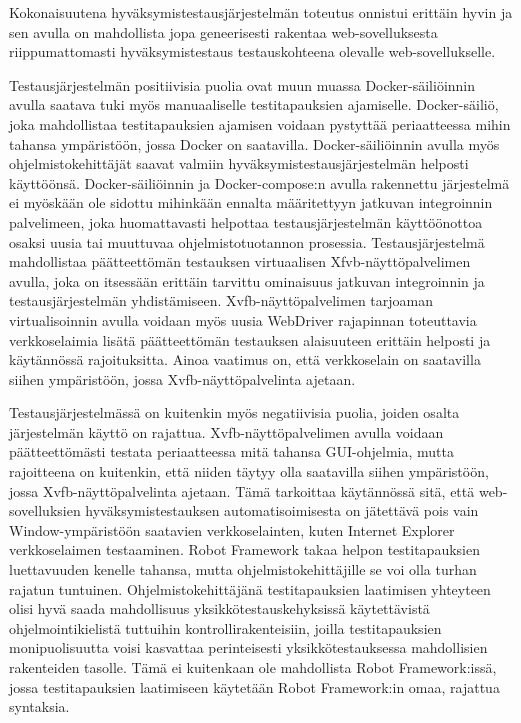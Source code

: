   Kokonaisuutena hyväksymistestausjärjestelmän toteutus onnistui erittäin hyvin ja sen avulla on mahdollista jopa geneerisesti rakentaa web-sovelluksesta riippumattomasti hyväksymistestaus testauskohteena olevalle web-sovellukselle.

  Testausjärjestelmän positiivisia puolia ovat muun muassa Docker-säiliöinnin avulla saatava tuki myös manuaaliselle testitapauksien ajamiselle.
  Docker-säiliö, joka mahdollistaa testitapauksien ajamisen voidaan pystyttää periaatteessa mihin tahansa ympäristöön, jossa Docker on saatavilla.
  Docker-säiliöinnin avulla myös ohjelmistokehittäjät saavat valmiin hyväksymistestausjärjestelmän helposti käyttöönsä.
  Docker-säiliöinnin ja Docker-compose:n avulla rakennettu järjestelmä ei myöskään ole sidottu mihinkään ennalta määritettyyn jatkuvan integroinnin palvelimeen, joka huomattavasti helpottaa testausjärjestelmän käyttöönottoa osaksi uusia tai muuttuvaa ohjelmistotuotannon prosessia.
  Testausjärjestelmä mahdollistaa päätteettömän testauksen virtuaalisen Xfvb-näyttöpalvelimen avulla, joka on itsessään erittäin tarvittu ominaisuus jatkuvan integroinnin ja testausjärjestelmän yhdistämiseen.
  Xvfb-näyttöpalvelimen tarjoaman virtualisoinnin avulla voidaan myös uusia WebDriver rajapinnan toteuttavia verkkoselaimia lisätä päätteettömän testauksen alaisuuteen erittäin helposti ja käytännössä rajoituksitta.
  Ainoa vaatimus on, että verkkoselain on saatavilla siihen ympäristöön, jossa Xvfb-näyttöpalvelinta ajetaan.

  Testausjärjestelmässä on kuitenkin myös negatiivisia puolia, joiden osalta järjestelmän käyttö on rajattua.
  Xvfb-näyttöpalvelimen avulla voidaan päätteettömästi testata periaatteessa mitä tahansa GUI-ohjelmia, mutta rajoitteena on kuitenkin, että niiden täytyy olla saatavilla siihen ympäristöön, jossa Xvfb-näyttöpalvelinta ajetaan.
  Tämä tarkoittaa käytännössä sitä, että web-sovelluksien hyväksymistestauksen automatisoimisesta on jätettävä pois vain Window-ympäristöön saatavien verkkoselainten, kuten Internet Explorer verkkoselaimen testaaminen.
  Robot Framework takaa helpon testitapauksien luettavuuden kenelle tahansa, mutta ohjelmistokehittäjille se voi olla turhan rajatun tuntuinen.
  Ohjelmistokehittäjänä testitapauksien laatimisen yhteyteen olisi hyvä saada mahdollisuus yksikkötestauskehyksissä käytettävistä ohjelmointikielistä tuttuihin kontrollirakenteisiin, joilla testitapauksien monipuolisuutta voisi kasvattaa perinteisesti yksikkötestauksessa mahdollisien rakenteiden tasolle.
  Tämä ei kuitenkaan ole mahdollista Robot Framework:issä, jossa testitapauksien laatimiseen käytetään Robot Framework:in omaa, rajattua syntaksia.

